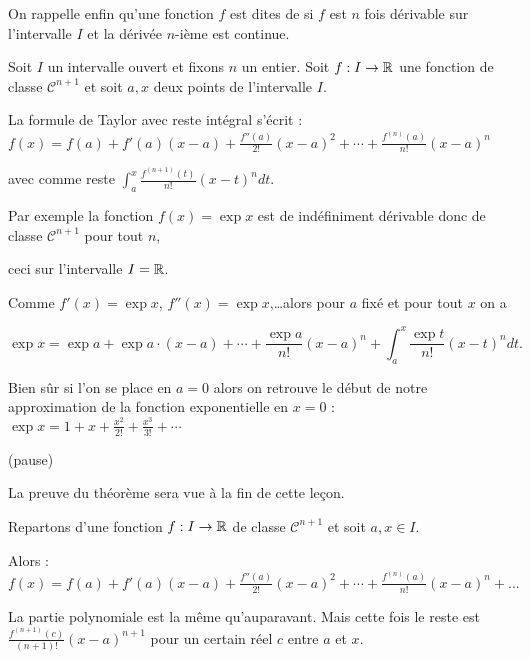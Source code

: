 On rappelle enfin qu'une fonction $f$ est dites de 
si $f$ est $n$ fois dérivable sur l'intervalle $I$ et la dérivée $n$-ième est continue.



\diapo

Soit $I$ un intervalle ouvert et fixons $n$ un entier.
Soit $f : I\to\mathbb{R}$ une fonction de classe $\mathcal{C}^{n+1}$
et soit $a,x$ deux points de l'intervalle $I$.

La formule de Taylor avec reste intégral s'écrit :
$
f(x)=f(a)+f'(a)(x-a)+\frac{f''(a)}{2!}(x-a)^2+\cdots
+\frac{f^{(n)}(a)}{n!}(x-a)^n$

\change

avec comme reste 
$\int_a^x \frac{f^{(n+1)}(t)}{n!}(x-t)^ndt.$

\change

\change

Par exemple la fonction $f(x)=\exp x$ est de indéfiniment dérivable donc de classe $\mathcal{C}^{n+1}$ pour tout $n$, 

ceci sur l'intervalle $I=\mathbb{R}$. 

\change

Comme $f'(x)=\exp x$, $f''(x)=\exp x$,\ldots alors pour $a$ fixé et pour tout $x$ on a

\change

$$\exp x=\exp a+\exp a \cdot (x-a)+\cdots+\frac{\exp a}{n!}(x-a)^n+\int_a^x\frac{\exp t}{n!}(x-t)^ndt.$$

\change

Bien sûr si l'on se place en $a=0$ alors on retrouve le début de notre approximation de la fonction
exponentielle en $x=0$ : $\exp x=1+x+\frac{x^2}{2!}+\frac{x^3}{3!}+\cdots$

(pause)

La preuve du théorème sera vue à la fin de cette leçon.



\diapo

Repartons d'une fonction $f : I\to\mathbb{R}$ de classe $\mathcal{C}^{n+1}$
et soit $a,x \in I$.

Alors :
$f(x)=f(a)+f'(a)(x-a)+\frac{f''(a)}{2!}(x-a)^2+\cdots
+\frac{f^{(n)}(a)}{n!}(x-a)^n +...$

\change

La partie polynomiale est la même qu'auparavant.
Mais cette fois le reste est 
$\frac{f^{(n+1)}(c)}{(n+1)!}(x-a)^{n+1}$
pour un certain réel $c$ entre $a$ et $x$.

